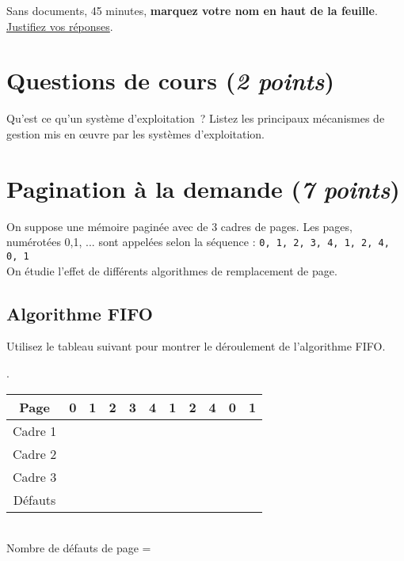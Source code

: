 \documentclass[11pt]{article}
\newcounter{cq}
\begin{document}
\maketitle

\vspace{0.2cm}
Sans documents, 45 minutes, \textbf{marquez votre nom en haut de la feuille}. 
\underline{Justifiez vos réponses}. 

\vspace{-0.4cm}
\section{Questions de cours (\emph{2 points})}
\vspace{-0.4cm}
Qu'est ce qu'un système d'exploitation~? Listez les principaux mécanismes de gestion
mis en \oe{}uvre par les systèmes d'exploitation. 

\vspace{-0.4cm}
\section{Pagination à la demande (\emph{7 points})}
\vspace{-0.4cm}
On suppose une mémoire paginée avec de 3 cadres de pages. Les pages,
numérotées 0,1, ... sont appelées selon la séquence : \texttt{0, 1, 2,
  3, 4, 1, 2, 4, 0, 1}\\
On étudie l'effet de différents algorithmes de remplacement de page.

\vspace{-0.4cm}
\subsection{Algorithme FIFO}
\vspace{-0.4cm}
Utilisez le tableau suivant pour montrer le déroulement de l'algorithme FIFO.

\begin{center}
\thecq. 
\begin{tabular}{|c|c|c|c|c|c|c|c|c|c|c|}
\hline
Page & 0& 1& 2& 3& 4& 1& 2& 4& 0& 1 \\

\hline \hline
Cadre 1 &&&&&&&&&& \\ \hline
Cadre 2 &&&&&&&&&& \\ \hline
Cadre 3 &&&&&&&&&& \\ \hline
\hline
Défauts &&&&&&&&&& \\ \hline
\end{tabular}\\
Nombre de défauts de page =  
\end{center}
\end{document}
